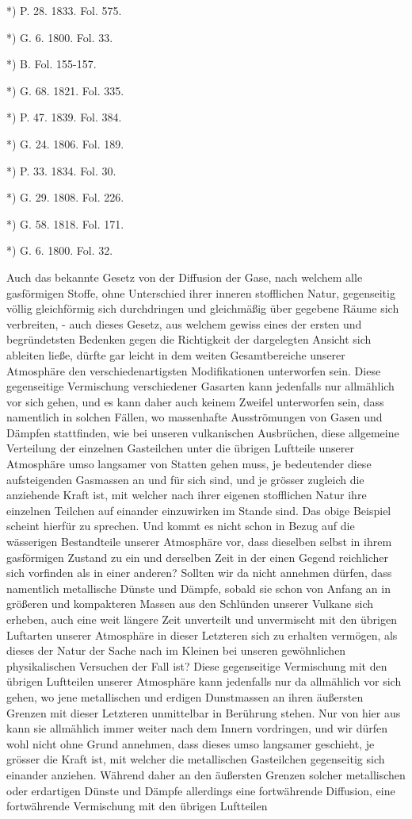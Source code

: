 \documentclass[a4paper, 8pt, oneside, polutonikogreek, german]{article}
\begin{document}
*) P. 28. 1833. Fol. 575.

*) G. 6. 1800. Fol. 33.

*) B. Fol. 155-157.

*) G. 68. 1821. Fol. 335.

*) P. 47. 1839. Fol. 384.

*) G. 24. 1806. Fol. 189.

*) P. 33. 1834. Fol. 30.

*) G. 29. 1808. Fol. 226.

*) G. 58. 1818. Fol. 171.

*) G. 6. 1800. Fol. 32.

Auch das bekannte Gesetz von der Diffusion der Gase, nach welchem alle gasförmigen Stoffe, ohne Unterschied ihrer inneren stofflichen Natur, gegenseitig völlig gleichförmig sich durchdringen und gleichmäßig über gegebene Räume sich verbreiten, - auch dieses Gesetz, aus welchem gewiss eines der ersten und begründetsten Bedenken gegen die Richtigkeit der dargelegten Ansicht sich ableiten ließe, dürfte gar leicht in dem weiten Gesamtbereiche unserer Atmosphäre den verschiedenartigsten Modifikationen unterworfen sein. Diese gegenseitige Vermischung verschiedener Gasarten kann jedenfalls nur allmählich vor sich gehen, und es kann daher auch keinem Zweifel unterworfen sein, dass namentlich in solchen Fällen, wo massenhafte Ausströmungen von Gasen und Dämpfen stattfinden, wie bei unseren vulkanischen Ausbrüchen, diese allgemeine Verteilung der einzelnen Gasteilchen unter die übrigen Luftteile unserer Atmosphäre umso langsamer von Statten gehen muss, je bedeutender diese aufsteigenden Gasmassen an und für sich sind, und je grösser zugleich die anziehende Kraft ist, mit welcher nach ihrer eigenen stofflichen Natur ihre einzelnen Teilchen auf einander einzuwirken im Stande sind. Das obige Beispiel scheint hierfür zu sprechen. Und kommt es nicht schon in Bezug auf die wässerigen Bestandteile unserer Atmosphäre vor, dass dieselben selbst in ihrem gasförmigen Zustand zu ein und derselben Zeit in der einen Gegend reichlicher sich vorfinden als in einer anderen? Sollten wir da nicht annehmen dürfen, dass namentlich metallische Dünste und Dämpfe, sobald sie schon von Anfang an in größeren und kompakteren Massen aus den Schlünden unserer Vulkane sich erheben, auch eine weit längere Zeit unverteilt und unvermischt mit den übrigen Luftarten unserer Atmosphäre in dieser Letzteren sich zu erhalten vermögen, als dieses der Natur der Sache nach im Kleinen bei unseren gewöhnlichen physikalischen Versuchen der Fall ist? Diese gegenseitige Vermischung mit den übrigen Luftteilen unserer Atmosphäre kann jedenfalls nur da allmählich vor sich gehen, wo jene metallischen und erdigen Dunstmassen an ihren äußersten Grenzen mit dieser Letzteren unmittelbar in Berührung stehen. Nur von hier aus kann sie allmählich immer weiter nach dem Innern vordringen, und wir dürfen wohl nicht ohne Grund annehmen, dass dieses umso langsamer geschieht, je grösser die Kraft ist, mit welcher die metallischen Gasteilchen gegenseitig sich einander anziehen. Während daher an den äußersten Grenzen solcher metallischen oder erdartigen Dünste und Dämpfe allerdings eine fortwährende Diffusion, eine fortwährende Vermischung mit den übrigen Luftteilen 
\end{document}
